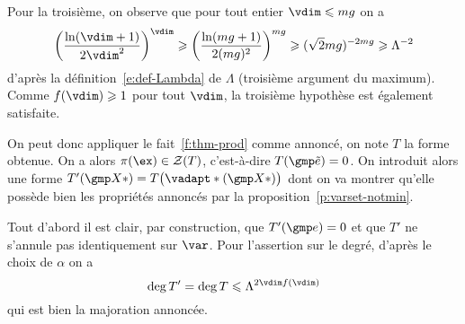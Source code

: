 Pour la troisième, on observe que pour tout entier \( \vdim \le \puiss\genre
\) on a
\begin{equation} \label{e:tp-3}
  \left( \frac{\ln(\vdim+1)}{2\vdim^2}\right)^\vdim
  \ge
  \left( \frac{\ln(\puiss\genre + 1)}{2(\puiss\genre)^2}\right)^{\puiss\genre}
  \ge
  (\sqrt2 \puiss\genre)^{-2\puiss\genre}
  \ge
  \Lambda^{-2}
\end{equation}
d'après la définition~\eqref{e:def-Lambda} de \( \Lambda \) (troisième
argument du maximum). Comme \( f(\vdim) \ge 1 \) pour tout \( \vdim \), la
troisième hypothèse est également satisfaite.

On peut donc appliquer le fait~\ref{f:thm-prod} comme annoncé, on note \( T \)
la forme obtenue. On a alors \( \pi(\ex) \in \zeros T \), c'est-à-dire \(
  T(\cexa) = 0 \). On introduit alors une forme \( T'(\vmp*) = T\bigl(
    \vadapt*(\vmp*) \bigr) \) dont on va montrer qu'elle possède bien
les propriétés annoncés par la proposition~\ref{p:varset-notmin}.

Tout d'abord il est clair, par construction, que \( T'(\cex) = 0 \) et que \(
  T' \) ne s'annule pas identiquement sur \( \var \). Pour l'assertion sur le
degré, d'après le choix de \( \alpha \) on a
\begin{equation}
  \deg T' = \deg T \le \Lambda^{2\vdim f(\vdim)}
\end{equation}
qui est bien la majoration annoncée.

